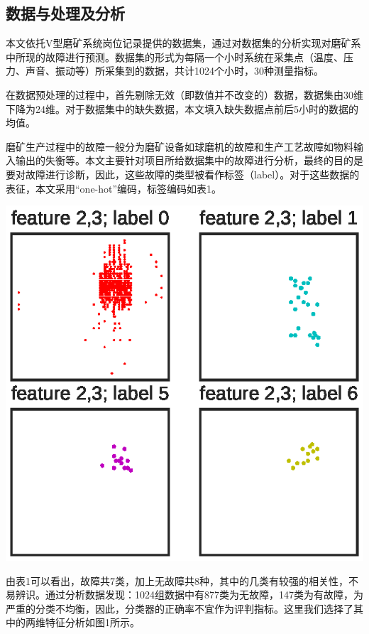 \documentclass{ctacn}%
\begin{document}
\begin{multicols}{2}
\subsection{数据与处理及分析}
本文依托V型磨矿系统岗位记录提供的数据集，通过对数据集的分析实现对磨矿系中所现的故障进行预测。数据集的形式为每隔一个小时系统在采集点（温度、压力、声音、振动等）所采集到的数据，共计1024个小时，30种测量指标。

在数据预处理的过程中，首先剔除无效（即数值并不改变的）数据，数据集由30维下降为24维。对于数据集中的缺失数据，本文填入缺失数据点前后5小时的数据的均值。

磨矿生产过程中的故障一般分为磨矿设备如球磨机的故障和生产工艺故障如物料输入输出的失衡等。本文主要针对项目所给数据集中的故障进行分析，最终的目的是要对故障进行诊断，因此，这些故障的类型被看作标签（label）。对于这些数据的表征，本文采用“one-hot”编码，标签编码如表1。


\begin{center}
	\includegraphics[scale=0.7, trim=0 0 0 0]{figs/data_features}\\
	\label{fig1}
\end{center}

由表1可以看出，故障共7类，加上无故障共8种，其中的几类有较强的相关性，不易辨识。通过分析数据发现：1024组数据中有877类为无故障，147类为有故障，为严重的分类不均衡，因此，分类器的正确率不宜作为评判指标。这里我们选择了其中的两维特征分析如图1所示。



\end{multicols}
\end{document}
